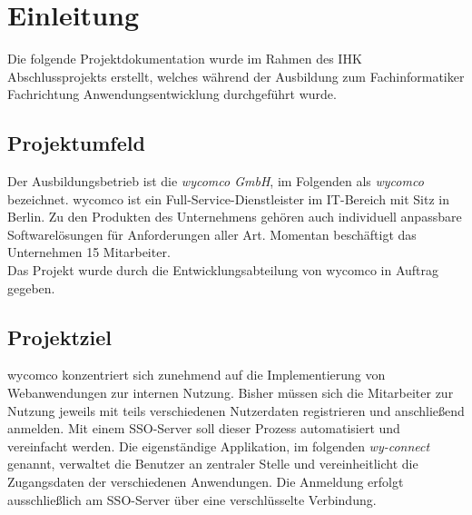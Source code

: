 \section{Einleitung}
\label{sec:Einleitung}
Die folgende Projektdokumentation wurde im Rahmen des IHK Abschlussprojekts erstellt, welches während der Ausbildung zum Fachinformatiker Fachrichtung Anwendungsentwicklung durchgeführt wurde.
\subsection{Projektumfeld} 
\label{sec:Projektumfeld}
Der Ausbildungsbetrieb ist die \textit{wycomco GmbH}, im Folgenden als \textit{wycomco} bezeichnet. wycomco ist ein Full-Service-Dienstleister im IT-Bereich mit Sitz in Berlin. Zu den Produkten des Unternehmens gehören auch individuell anpassbare Softwarelösungen für Anforderungen aller Art. Momentan beschäftigt das Unternehmen 15 Mitarbeiter. \\
Das Projekt wurde durch die Entwicklungsabteilung von wycomco in Auftrag gegeben. 
\subsection{Projektziel} 
\label{sec:Projektziel}
wycomco konzentriert sich zunehmend auf die Implementierung von Webanwendungen zur internen Nutzung. Bisher müssen sich die Mitarbeiter zur Nutzung jeweils mit teils verschiedenen Nutzerdaten registrieren und anschließend anmelden.
Mit einem \ac{SSO}-Server soll dieser Prozess automatisiert und vereinfacht werden. Die eigenständige Applikation, im folgenden \textit{wy-connect} genannt, verwaltet die Benutzer an zentraler Stelle und vereinheitlicht die Zugangsdaten der verschiedenen Anwendungen. Die Anmeldung erfolgt ausschließlich am \ac{SSO}-Server über eine verschlüsselte Verbindung.
